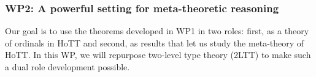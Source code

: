 \documentclass[a4paper,11pt]{article}
\begin{document}






\subsubsection*{WP2: A powerful setting for meta-theoretic reasoning}
\vspace*{-0.25em}
Our goal is to use the theorems developed in WP1 in two roles: first, as a theory of ordinals in HoTT and second, as results that let us study the meta-theory of HoTT.
%
In this WP, we will repurpose two-level type theory (2LTT) to make such a dual role development possible.
\end{document}
